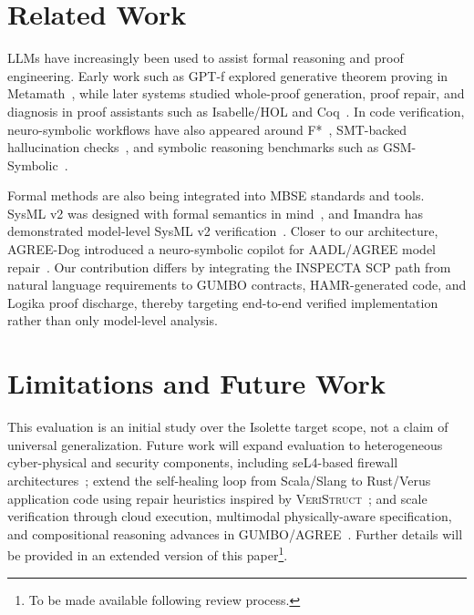 \documentclass[conference]{IEEEtran}
\newcommand{\todo}[1]{\textcolor{red}{\textbf{TODO}: {#1}}}
\begin{document}
\fi

\section{Related Work}
\label{sec:related-work}

LLMs have increasingly been used to assist formal reasoning and proof engineering. Early work such as GPT-f explored generative theorem proving in Metamath~\cite{polu2020generative}, while later systems studied whole-proof generation, proof repair, and diagnosis in proof assistants such as Isabelle/HOL and Coq~\cite{first2023baldur,CoqDog}. In code verification, neuro-symbolic workflows have also appeared around F*~\cite{DBLP:conf/popl/SwamyHKRDFBFSKZ16}, SMT-backed hallucination checks~\cite{aws_bedrock_ar}, and symbolic reasoning benchmarks such as GSM-Symbolic~\cite{mirzadeh2025gsmsymbolic}.

Formal methods are also being integrated into MBSE standards and tools. SysML v2 was designed with formal semantics in mind~\cite{sysmlv2}, and Imandra has demonstrated model-level SysML v2 verification~\cite{imandra_sysml}. Closer to our architecture, AGREE-Dog introduced a neuro-symbolic copilot for AADL/AGREE model repair~\cite{agreedog_tahat2025,feiler-aadl}. Our contribution differs by integrating the INSPECTA SCP path from natural language requirements to GUMBO contracts, HAMR-generated code, and Logika proof discharge, thereby targeting end-to-end verified implementation rather than only model-level analysis.

\section{Limitations and Future Work}
\label{sec:limitations}

This evaluation is an initial study over the Isolette target scope, not a claim of universal generalization. Future work will expand evaluation to heterogeneous cyber-physical and security components, including seL4-based firewall architectures~\cite{Hatcliff:seL4Summit2025}; extend the self-healing loop from Scala/Slang to Rust/Verus application code using repair heuristics inspired by \textsc{VeriStruct}~\cite{sun2025veristruct}; and scale verification through cloud execution, multimodal physically-aware specification, and compositional reasoning advances in GUMBO/AGREE~\cite{compositional-analysis-agree,agreedog_tahat2025}. Further details will be provided in an extended version of this paper\footnote{To be made available following review process.}.
\end{document}
